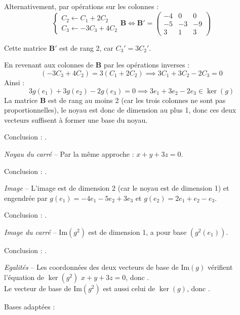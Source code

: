 \documentclass[10pt,a4paper]{article}
\begin{document}
Alternativement, par opérations sur les colonnes :
\[
\begin{cases}
    C_2 \leftarrow C_1 + 2 C_2\\
    C_3 \leftarrow -3 C_3 + 4 C_2
 \end{cases}
\mathbf{B} \iff \mathbf{B'} =
\begin{pmatrix}
     -4 & 0 & 0 \\
     -5 & -3 & -9 \\
     3 & 1 & 3
\end{pmatrix}
\]

Cette matrice \(\mathbf{B'}\) est de rang 2, car \(C_3' = 3 C_2'\).

En revenant aux colonnes de \( \mathbf{B}\) par les opérations inverses :
\[
(-3 C_3 + 4 C_2) = 3(C_1 + 2 C_2) \implies 3 C_1 + 3 C_2 - 2 C_3 = 0
\]
Ainsi :
\[
3 g(e_1) + 3 g(e_2) - 2 g(e_3) = 0 \implies 3 e_1 + 3 e_2 - 2 e_3 \in \ker(g)
\]
La matrice \(\mathbf{B}\) est de rang au moins 2 (car les trois colonnes ne sont pas proportionnelles), le noyau est donc de dimension au
 plus 1, donc ces deux vecteurs suffisent à former une base du noyau.

Conclusion : .

\textit{Noyau du carré} -- Par la même approche : \(x + y + 3z = 0\).

Conclusion : .

\textit{Image} -- L'image est de dimension 2 (car le noyau est de dimension 1) et engendrée par
 \(g(e_1) = -4 e_1 - 5 e_2  + 3 e_3\) et \(g(e_2) = 2 e_1 + e_2 - e_3\).

Conclusion : .

\textit{Image du carré} -- \(\text{Im}(g^2)\) est de dimension 1, a pour base \((g^2(e_1))\).

Conclusion : .

\textit{Egalités} -- Les coordonnées des deux vecteurs de base de \(\text{Im}(g)\) vérifient l'équation de \(\ker(g^2)\) \(x + y + 3z = 0\), donc .\\
Le vecteur de base de \(\text{Im}(g^2)\) est aussi celui de \(\ker(g)\), donc .

\q Bases adaptées :
\end{document}
